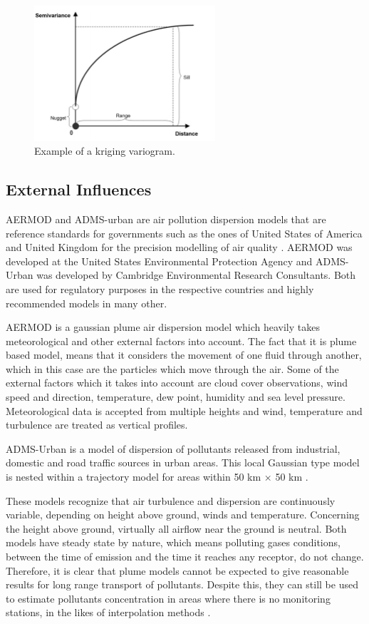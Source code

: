 \begin{figure}[ht]
\centering
\includegraphics[width=0.6\textwidth]{./Images/variogram.png}
\caption{Example of a kriging variogram.}
\label{fig:variogram}
\end{figure}

\subsection{External Influences}

AERMOD and ADMS-urban are air pollution dispersion models that are reference standards for governments such as the ones of United States of America and United Kingdom for the precision modelling of air quality \cite{Mohan2011}.
AERMOD was developed at the United States Environmental Protection Agency and ADMS-Urban was developed by Cambridge Environmental Research Consultants. Both are used for regulatory purposes in the respective countries and highly recommended models in many other.

AERMOD is a gaussian plume air dispersion model which heavily takes meteorological and other external factors into account. The fact that it is plume based model, means that it considers the movement of one fluid through another, which in this case are the particles which move through the air. Some of the external factors which it takes into account are cloud cover observations, wind speed and direction, temperature, dew point,
humidity and sea level pressure. Meteorological data is accepted from multiple heights and wind, temperature and turbulence are treated as vertical profiles.

ADMS-Urban is a model of dispersion of pollutants released from industrial, domestic and road traffic sources in urban areas. This local Gaussian type model is nested within a trajectory model for areas within 50 km × 50 km \cite{Lee2013}.

These models recognize that air turbulence and dispersion are continuously variable, depending on height above ground, winds and temperature. Concerning the height above ground, virtually all airflow near the ground is neutral. Both models have steady state by nature, which means polluting gases conditions, between the time of emission and the time it reaches any receptor, do not change. Therefore, it is clear that plume models cannot be expected to give reasonable results for long range transport of pollutants.
Despite this, they can still be used to estimate pollutants concentration in areas where there is no monitoring stations, in the likes of interpolation methods \cite{Lee2013}.

